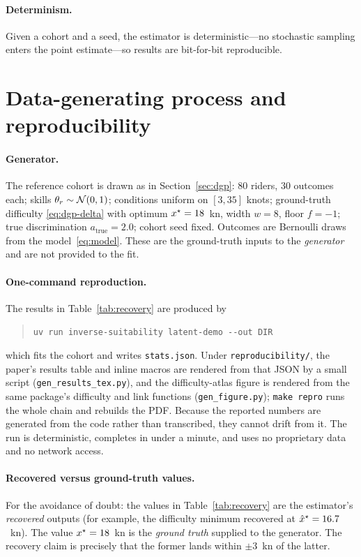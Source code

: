\paragraph{Determinism.} Given a cohort and a seed, the estimator is
deterministic---no stochastic sampling enters the point estimate---so results are
bit-for-bit reproducible.

\section{Data-generating process and reproducibility}
\label{app:repro}

\paragraph{Generator.} The reference cohort is drawn as in Section~\ref{sec:dgp}:
$80$ riders, $30$ outcomes each; skills $\theta_r \sim \mathcal{N}(0,1)$;
conditions uniform on $[3,35]$ knots; ground-truth difficulty
\eqref{eq:dgp-delta} with optimum $x^\star = 18$~kn, width $w = 8$, floor
$f = -1$; true discrimination $a_{\text{true}} = 2.0$; cohort seed fixed. Outcomes
are Bernoulli draws from the model~\eqref{eq:model}. These are the ground-truth
inputs to the \emph{generator} and are not provided to the fit.

\paragraph{One-command reproduction.} The results in Table~\ref{tab:recovery} are
produced by
\begin{quote}
  \verb|uv run inverse-suitability latent-demo --out DIR|
\end{quote}
which fits the cohort and writes \texttt{stats.json}. Under
\texttt{reproducibility/}, the paper's results table and inline macros are
rendered from that JSON by a small script (\texttt{gen\_results\_tex.py}), and the
difficulty-atlas figure is rendered from the same package's difficulty and link
functions (\texttt{gen\_figure.py}); \texttt{make repro} runs the whole
chain and rebuilds the PDF. Because the reported numbers are generated from the
code rather than transcribed, they cannot drift from it. The run is deterministic,
completes in under a minute, and uses no proprietary data and no network access.

\paragraph{Recovered versus ground-truth values.} For the avoidance of doubt: the
values in Table~\ref{tab:recovery} are the estimator's \emph{recovered} outputs
(for example, the difficulty minimum recovered at
$\hat{x}^\star = 16.7$~kn). The value $x^\star = 18$~kn is
the \emph{ground truth} supplied to the generator. The recovery claim is precisely
that the former lands within $\pm 3$~kn of the latter.

